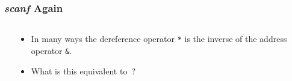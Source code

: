 \begin{frame}[fragile]
\frametitle{{\em scanf} Again}
\begin{columns}[T]

\begin{column}{0.45\textwidth}

\end{column}

\pause
\begin{column}{0.45\textwidth}
\begin{itemize}[<+->]
\item In many ways the dereference operator \verb^*^ is
the inverse of the address operator \verb^&^.

\item What is this equivalent to~?
\end{itemize}
\end{column}

\end{columns}
\end{frame}


